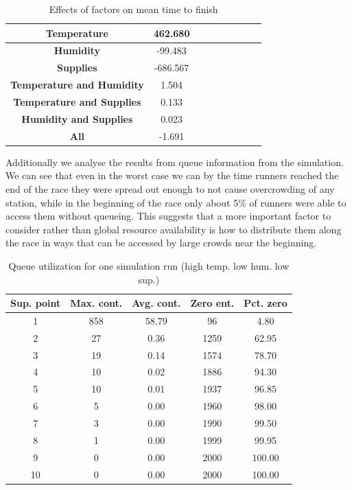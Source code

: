 \documentclass[conference]{IEEEtran}
\begin{document}
\begin{table}[htbp]
\caption{Effects of factors on mean time to finish}
\begin{center}
\begin{tabular}{|c|c|c|c|c|c|c|c|c|}
\hline
\textbf{Temperature} & 462.680\\
\hline
\textbf{Humidity} & -99.483\\
\hline
\textbf{Supplies} & -686.567\\
\hline
\textbf{Temperature and Humidity} & 1.504\\
\hline
\textbf{Temperature and Supplies}& 0.133\\
\hline
\textbf{Humidity and Supplies}&0.023\\
\hline
\textbf{All}&-1.691\\
\hline
\end{tabular}
\label{tab:results}
\end{center}
\end{table}

Additionally we analyse the results from queue information from the simulation. We can see that even in the worst case we can by the time runners reached the end of the race they were spread out enough to not cause overcrowding of any station, while in the beginning of the race only about 5\% of runners were able to access them without queueing. This suggests that a more important factor to consider rather than global resource availability is how to distribute them along the race in ways that can be accessed by large crowds near the beginning.

\begin{table}[htbp]
\caption{Queue utilization for one simulation run (high temp. low hum. low sup.)}
\begin{center}
\begin{tabular}{|c|c|c|c|c|}
\hline
\textbf{Sup. point}&\textbf{Max. cont.}&\textbf{Avg. cont.}&\textbf{Zero ent.}&\textbf{Pct. zero}\\
\hline
1&858&58.79&96&4.80\\
\hline
2&27&0.36&1259&62.95\\
\hline
3&19&0.14&1574&78.70\\
\hline
4&10&0.02&1886&94.30\\
\hline
5&10&0.01&1937&96.85\\
\hline
6&5&0.00&1960&98.00\\
\hline
7&3&0.00&1990&99.50\\
\hline
8&1&0.00&1999&99.95\\
\hline
9&0&0.00&2000&100.00\\
\hline
10&0&0.00&2000&100.00\\
\hline
\end{tabular}
\label{tab:queue_results}
\end{center}
\end{table}
\end{document}
